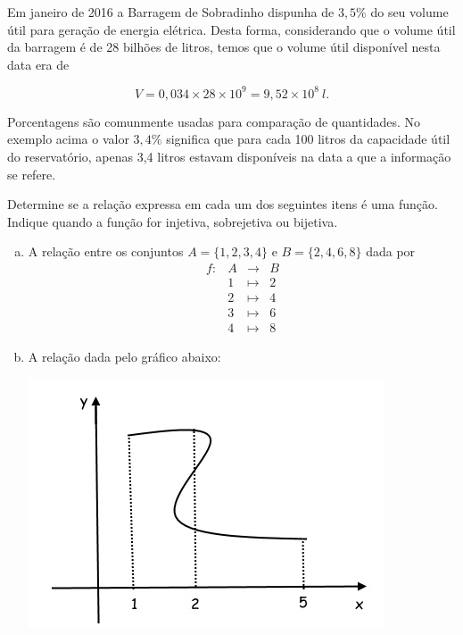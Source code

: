 \begin{exemplo} Em janeiro de 2016 a Barragem de Sobradinho dispunha de $3,5\%$ do seu volume útil para geração de energia elétrica.
Desta forma, considerando que o volume útil da barragem é de 28 bilhões de litros, temos que o volume útil disponível nesta data era de

$$V=0,034\times28\times10^9=9,52\times10^8 \ l.$$
\end{exemplo}

Porcentagens são comunmente usadas para comparação de quantidades.  No exemplo acima o valor $3,4\%$ significa que
para cada 100 litros da capacidade útil do reservatório, apenas 3,4 litros estavam disponíveis na data a que a informação se refere.

\begin{secaoexercicio}

\begin{xca} Determine se a relação expressa em cada um dos seguintes itens é uma função. Indique quando a função for injetiva, sobrejetiva ou bijetiva.

\begin{enumerate}[(a)]
\item A relação entre os conjuntos $A=\{1,2,3,4\}$ e $B=\{2,4,6,8\}$ dada por
$$\begin{array}{crcl}
f:&A&\rightarrow&B\\
&1&\mapsto&2\\
&2&\mapsto&4\\
&3&\mapsto&6\\
&4&\mapsto&8
\end{array}$$

\item A relação dada pelo gráfico abaixo:

\begin{center}
\includegraphics[scale=0.8]{./chapters/preliminares/imgs/naofuncao}
\end{center}


\end{enumerate}
\end{xca}
\end{secaoexercicio}
